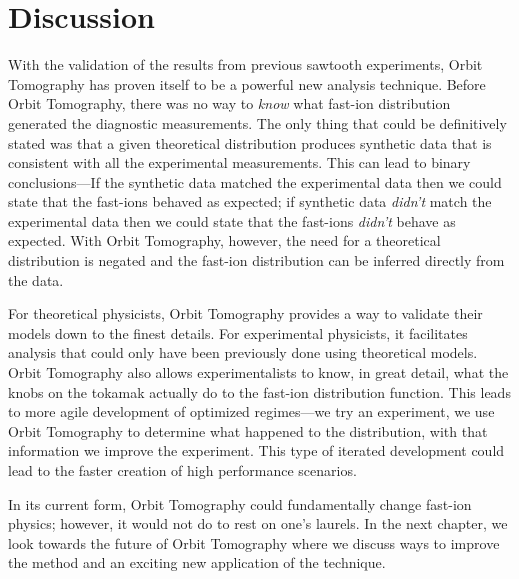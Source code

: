 \section{Discussion}
With the validation of the results from previous sawtooth experiments, Orbit Tomography has proven itself to be a powerful new analysis technique.
Before Orbit Tomography, there was no way to \textit{know} what fast-ion distribution generated the diagnostic measurements.
The only thing that could be definitively stated was that a given theoretical distribution produces synthetic data that is consistent with all the experimental measurements.
This can lead to binary conclusions---If the synthetic data matched the experimental data then we could state that the fast-ions behaved as expected; if synthetic data \textit{didn't} match the experimental data then we could state that the fast-ions \textit{didn't} behave as expected.
With Orbit Tomography, however, the need for a theoretical distribution is negated and the fast-ion distribution can be inferred directly from the data.

For theoretical physicists, Orbit Tomography provides a way to validate their models down to the finest details.
For experimental physicists, it facilitates analysis that could only have been previously done using theoretical models.
Orbit Tomography also allows experimentalists to know, in great detail, what the knobs on the tokamak actually do to the fast-ion distribution function.
This leads to more agile development of optimized regimes---we try an experiment, we use Orbit Tomography to determine what happened to the distribution, with that information we improve the experiment. This type of iterated development could lead to the faster creation of high performance scenarios. 

In its current form, Orbit Tomography could fundamentally change fast-ion physics; however, it would not do to rest on one's laurels. In the next chapter, we look towards the future of Orbit Tomography where we discuss ways to improve the method and an exciting new application of the technique.